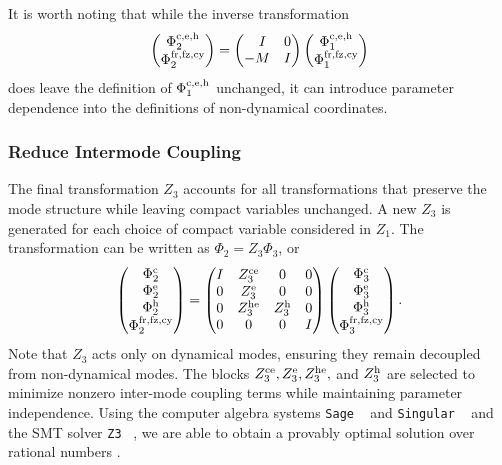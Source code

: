 It is worth noting that while the inverse transformation 
\begin{align}
    \begin{pmatrix}
        \Phi_2^{\rm c,e,h} \\ \Phi_2^{\rm fr,fz,cy}
    \end{pmatrix} = \begin{pmatrix}
    \phantom{-}I & 0 \\
    -M & I
\end{pmatrix} \begin{pmatrix}
        \Phi_1^{\rm c,e,h} \\ \Phi_1^{\rm fr,fz,cy}
    \end{pmatrix}
\end{align}
does leave the definition of $\Phi_1^{\rm c,e,h}$ unchanged, it can introduce parameter dependence into the definitions of non-dynamical coordinates.

\subsubsection{Reduce Intermode Coupling}

The final transformation $Z_3$ accounts for all transformations that preserve the mode structure while leaving compact variables unchanged. A new $Z_3$ is generated for each choice of compact variable considered in $Z_1$. The transformation can be written as $\Phi_2 = Z_3\Phi_3$, or
\begin{align}\label{eq:Z3}
    \begin{pmatrix}
        \Phi_2^{\rm c} \\\Phi_2^{\rm e} \\ \Phi_2^{\rm h} \\
       \Phi_2^{\rm fr,fz,cy}
    \end{pmatrix} = \begin{pmatrix}
        I & Z_3^{\rm ce} & 0 & 0 \\
        0 & Z_3^{\rm e} & 0 & 0 \\
        0 & Z_3^{\rm{he}} & Z_3^{\rm h} & 0 \\
        0 & 0 & 0 & I  \\
    \end{pmatrix} 
    \begin{pmatrix}
    \Phi_3^{\rm c} \\\Phi_3^{\rm e} \\\Phi_3^{\rm h} \\
    \Phi_3^{\rm fr,fz,cy}
    \end{pmatrix}.
\end{align}
Note that $Z_3$ acts only on dynamical modes, ensuring they remain decoupled from non-dynamical modes. The blocks $Z_3^{\rm ce}, Z_3^{\rm e}, Z_3^{\rm he},$ and $Z_3^{\rm h}$ are selected to minimize nonzero inter-mode coupling terms while maintaining parameter independence. Using the computer algebra systems \texttt{Sage} ~\cite{sagemath} and \texttt{Singular} ~\cite{Singular_2024} and the SMT solver \texttt{Z3} ~\cite{DeMouraBjornerZ3_2008}, we are able to obtain a provably optimal solution over rational numbers \cite{sircuitenum_repo, CircuitQuantPaper2026}.

